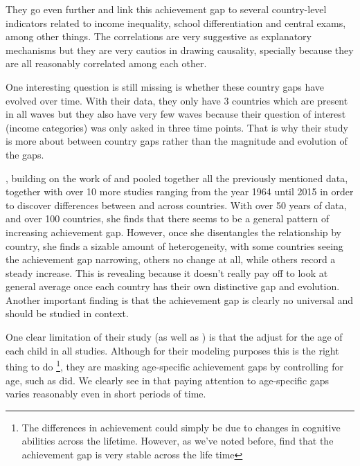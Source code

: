 \documentclass[11pt, a4paper]{article}\usepackage[]{graphicx}\usepackage[]{color}
\begin{document}
They go even further and link this achievement gap to several country-level indicators related to income inequality, school differentiation and central exams, among other things. The correlations are very suggestive  as explanatory mechanisms but they are very cautios in drawing causality, specially because they are all reasonably correlated among each other.

One interesting question is still missing is whether these country gaps have evolved over time. With their data, they only have 3 countries which are present in all waves but they also have very few waves because their question of interest (income categories) was only asked in three time points. That is why their study is more about between country gaps rather than the magnitude and evolution of the gaps.

\citet{anna2016_global}, building on the work of \citet{anna2016} and \citet{reardon_portilla} pooled together all the previously mentioned data, together with over 10 more studies ranging from the year 1964 until 2015 in order to discover differences between and across countries. With over 50 years of data, and over 100 countries, she finds that there seems to be a general pattern of increasing achievement gap. However, once she disentangles the relationship by country, she finds a sizable amount of heterogeneity, with some countries seeing the achievement gap narrowing, others no change at all, while others record a steady increase. This is revealing because it doesn't really pay off to look at general average once each country has their own distinctive gap and evolution. Another important finding is that the achievement gap is clearly no universal and should be studied in context. 

One clear limitation of their study (as well as \citet{reardon2011}) is that the adjust for the age of each child in all studies. Although for their modeling purposes this is the right thing to do \footnote{The differences in achievement could simply be due to changes in cognitive abilities across the lifetime. However, as we've noted before, \citet{bradbury2015} find that the achievement gap is very stable across the life time}, they are masking age-specific achievement gaps by controlling for age, such as \citet{reardon2011} did. We clearly see in \citet{reardon_portilla} that paying attention to age-specific gaps varies reasonably even in short periods of time.
\end{document}
